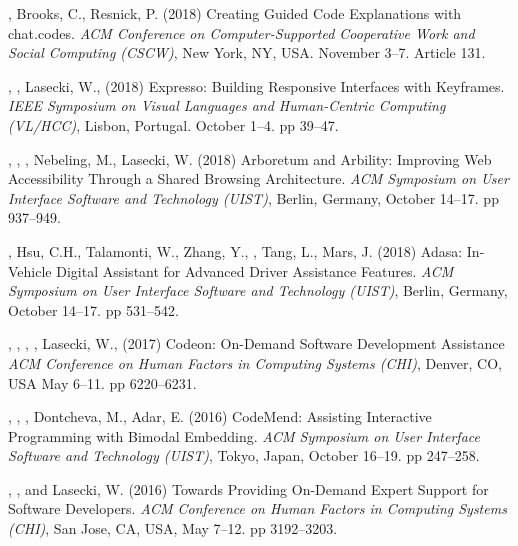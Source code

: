  {
    , Brooks, C., Resnick, P. (2018) Creating Guided Code Explanations with chat.codes. \textit{ACM Conference on Computer-Supported Cooperative Work and Social Computing (CSCW)}, New York, NY, USA. November 3--7. Article 131.
}

 {
    , , Lasecki, W.,  (2018) Expresso: Building Responsive Interfaces with Keyframes. \textit{IEEE Symposium on Visual Languages and Human-Centric Computing (VL/HCC)}, Lisbon, Portugal. October 1--4. pp 39--47.
}

 {
    , , , Nebeling, M., Lasecki, W. (2018) Arboretum and Arbility: Improving Web Accessibility Through a Shared Browsing Architecture. \textit{ACM Symposium on User Interface Software and Technology (UIST)}, Berlin, Germany, October 14--17. pp 937--949.
}

 {
    , Hsu, C.H., Talamonti, W., Zhang, Y., , Tang, L., Mars, J. (2018) Adasa: In-Vehicle Digital Assistant for Advanced Driver Assistance Features. \textit{ACM Symposium on User Interface Software and Technology (UIST)}, Berlin, Germany, October 14--17. pp 531--542.
}

 {
    , , , , Lasecki, W.,  (2017) Codeon: On-Demand Software Development Assistance \textit{ACM Conference on Human Factors in Computing Systems (CHI)}, Denver, CO, USA May 6--11. pp 6220--6231.
}

 {
    , , , Dontcheva, M., Adar, E. (2016) CodeMend: Assisting Interactive Programming with Bimodal Embedding. \textit{ACM Symposium on User Interface Software and Technology (UIST)}, Tokyo, Japan, October 16--19. pp 247--258.
}

 {
    , , and Lasecki, W. (2016) Towards Providing On-Demand Expert Support for Software Developers. \textit{ACM Conference on Human Factors in Computing Systems (CHI)}, San Jose, CA, USA, May 7--12. pp 3192--3203.
}

